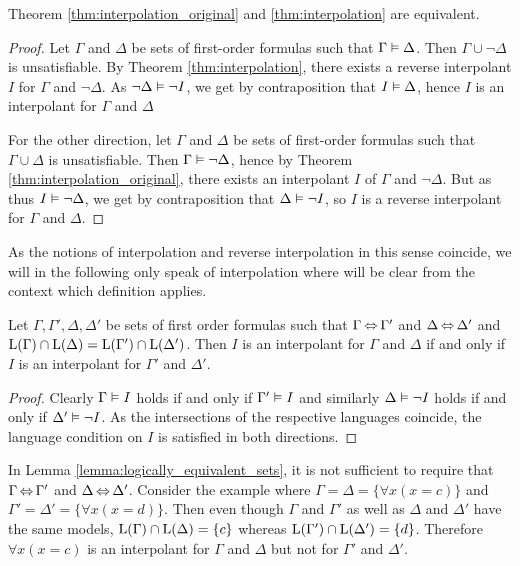 \begin{prop}
	Theorem \ref{thm:interpolation_original} and \ref{thm:interpolation} are equivalent.
	\label{prop:interpolations_equivalent}
\end{prop}
\begin{proof}
	Let $\Gamma$ and $\Delta$ be sets of first-order formulas such that $ \Gamma \vDash \Delta$.
	Then $\Gamma \cup \lnot \Delta$ is unsatisfiable.
	By Theorem \ref{thm:interpolation}, there exists a reverse interpolant $I$ for $\Gamma$ and $\lnot \Delta$.
	As $\lnot \Delta \vDash \lnot I$, we get by contraposition that $I \vDash \Delta$, hence $I$ is an interpolant for $\Gamma$ and $\Delta$

	For the other direction,
	let $\Gamma$ and $\Delta$ be sets of first-order formulas such that $ \Gamma \cup \Delta$ is unsatisfiable.
	Then $\Gamma \vDash \lnot \Delta$, hence by Theorem \ref{thm:interpolation_original}, there exists an interpolant $I$ of $\Gamma$ and $\lnot \Delta$.
	But as thus $ I\vDash \lnot \Delta$, we get by contraposition that $\Delta \vDash \lnot I$, so $I$ is a reverse interpolant for $\Gamma$ and $\Delta$.
\end{proof}

As the notions of interpolation and reverse interpolation in this sense coincide, we will in the following only speak of interpolation where  will be clear from the context which definition applies.

\begin{lemma}
	\label{lemma:logically_equivalent_sets}
	Let $\Gamma, \Gamma', \Delta, \Delta'$ be sets of first order formulas such that $\Gamma \operatorname{\Leftrightarrow} \Gamma'$ and $\Delta \operatorname{\Leftrightarrow} \Delta'$ and $\operatorname{L}(\Gamma) \cap \operatorname{L}(\Delta) = \operatorname{L}(\Gamma') \cap \operatorname{L}(\Delta')$.
	Then $I$ is an interpolant for $\Gamma$ and $\Delta$ if and only if $I$ is an interpolant for $\Gamma'$ and $\Delta'$.
\end{lemma}
\begin{proof}
	Clearly $\Gamma \vDash I$ holds if and only if $\Gamma' \vDash I$ and similarly
	$\Delta \vDash \lnot I$ holds if and only if $\Delta' \vDash \lnot I$.
	As the intersections of the respective languages coincide, the language condition on $I$ is satisfied in both directions.
\end{proof}

\begin{remark}
	In Lemma \ref{lemma:logically_equivalent_sets}, it is not sufficient to require that $\Gamma \operatorname{\Leftrightarrow} \Gamma'$ and $\Delta \operatorname{\Leftrightarrow} \Delta'$. 
	Consider the example where
	$\Gamma = \Delta = \{ \forall x (x=c)\}$
	and 
	$\Gamma' = \Delta' = \{ \forall x (x=d)\}$.
	Then even though $\Gamma$ and $\Gamma'$ as well as $\Delta$ and $\Delta'$ have the same models,
	$\operatorname{L}(\Gamma) \cap \operatorname{L}(\Delta) = \{c\}$
	whereas
	$\operatorname{L}(\Gamma') \cap \operatorname{L}(\Delta') = \{d\}$.
	Therefore $\forall x (x=c)$ is an interpolant for $\Gamma$ and $\Delta$ but not for $\Gamma'$ and $\Delta'$.
\end{remark}

